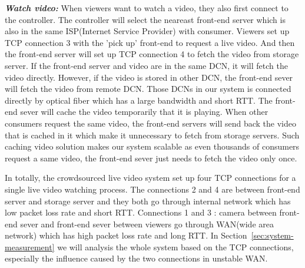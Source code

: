 \textbf{\textit{Watch video:}} When viewers want to watch a video, they also first connect to the controller. The controller will select the neareast front-end server which is also in the same ISP(Internet Service Provider) with consumer. Viewers set up TCP connection 3 with the 'pick up' front-end to request a live video. And then the front-end server will set up  TCP connection 4 to fetch the video from storage server. If the front-end server and video are in the same DCN, it will fetch the video directly. However, if the video is stored in other DCN, the front-end sever will fetch the video from remote DCN. Those DCNs in our system is connected directly by optical fiber which has a large bandwidth and short RTT. The front-end sever will cache the video temporarily that it is playing. When other consumers request the same video, the front-end servers will send back the video that is cached in it which make it unnecessary to fetch from storage servers. Such caching video solution makes our system scalable as even thousands of consumers request a same video, the front-end sever just needs to fetch the video only once.

In totally, the crowdsourced live video system set up four TCP connections for a single live video watching process. The connections 2 and 4 are between front-end server and storage server and they both go through internal network which has low packet loss rate and short RTT. Connections 1 and 3 : camera between front-end sever and front-end sever between viewers go through WAN(wide area network) which has high packet loss rate and long RTT. In Section~\ref{sec:system-measurement} we will analysis the whole system based on the TCP connections, especially the influence caused by the two connections in unstable WAN.

  

